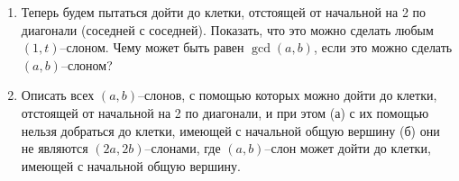 \begin{enumerate}
\item Теперь будем пытаться дойти до клетки, отстоящей от начальной на 2 по диагонали (соседней с соседней). Показать, что это можно сделать любым $(1,t)$--слоном. Чему может быть равен $\gcd (a,b)$, если это можно сделать $(a,b)$--слоном?

\item Описать всех $(a,b)$--слонов, с помощью которых можно дойти до клетки, отстоящей от начальной на 2 по диагонали, и при этом (а) с их помощью нельзя добраться до клетки, имеющей с начальной общую вершину (б) они не являются $(2a,2b)$--слонами, где $(a,b)$--слон может дойти до клетки, имеющей с начальной общую вершину.

\end{enumerate}